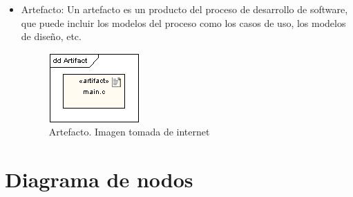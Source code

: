 \begin{itemize}
\item Artefacto: Un artefacto es un producto del proceso de desarrollo de software, que puede incluir los modelos del proceso como los casos de uso, los modelos de diseño, etc.

\begin{figure}[H]
	\centering
	\includegraphics[width=0.5\linewidth]{diseno/nodos/imgs/4}
	\caption{Artefacto. Imagen tomada de internet}
	\label{fig:gantt}
\end{figure}

\end{itemize}

\section{Diagrama de nodos}
